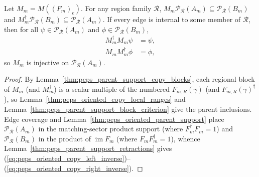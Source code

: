 \begin{lemma}%
    \label{thm:peps_oriented_copy_parent_inverses}
    \leanok
    Let $M_m=M((F_m)_e)$. For any region family $\mathcal R$, $M_m\mathcal P_{\mathcal R}(A_m)\subseteq\mathcal P_{\mathcal R}(B_m)$ and $M_m^\dagger\mathcal P_{\mathcal R}(B_m)\subseteq\mathcal P_{\mathcal R}(A_m)$. If every edge is internal to some member of $\mathcal R$, then for all $\psi\in\mathcal P_{\mathcal R}(A_m)$ and $\phi\in\mathcal P_{\mathcal R}(B_m)$,
    \begin{align}
        M_m^\dagger M_m\psi & =\psi,
        \label{eq:peps_oriented_copy_left_inverse} \\
        M_mM_m^\dagger\phi  & =\phi,
        \label{eq:peps_oriented_copy_right_inverse}
    \end{align}
    so $M_m$ is injective on $\mathcal P_{\mathcal R}(A_m)$.
\end{lemma}
\begin{proof}\leanok
    By Lemma~\ref{thm:peps_parent_support_copy_blocks}, each regional block of $M_m$ (and $M_m^\dagger$) is a scalar multiple of the numbered $F_{m,R}(\gamma)$ (and $F_{m,R}(\gamma)^\dagger$), so Lemma~\ref{thm:peps_oriented_copy_local_ranges} and Lemma~\ref{thm:peps_parent_support_block_criterion} give the parent inclusions. Edge coverage and Lemma~\ref{thm:peps_oriented_parent_support} place $\mathcal P_{\mathcal R}(A_m)$ in the matching-sector product support (where $F_m^\dagger F_m=1$) and $\mathcal P_{\mathcal R}(B_m)$ in the product of $\operatorname{im}F_m$ (where $F_mF_m^\dagger=1$), whence Lemma~\ref{thm:peps_parent_support_retractions} gives (\ref{eq:peps_oriented_copy_left_inverse})--(\ref{eq:peps_oriented_copy_right_inverse}).
\end{proof}

